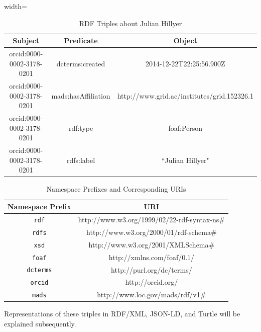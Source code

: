 \begin{table}
    \centering
    \begin{adjustbox}{width=\textwidth}
        \begin{tabular}{|c|c|c|}
            \hline
             \textbf{Subject} & \textbf{Predicate} & \textbf{Object} \\
            \hline
             orcid:0000-0002-3178-0201 & dcterms:created & 2014-12-22T22:25:56.900Z \\
             orcid:0000-0002-3178-0201 & mads:hasAffiliation & http://www.grid.ac/institutes/grid.152326.1 \\
             orcid:0000-0002-3178-0201 & rdf:type & foaf:Person \\
             orcid:0000-0002-3178-0201 & rdfs:label & ``Julian Hillyer" \\
            \hline
        \end{tabular}
    \end{adjustbox}
    \caption{RDF Triples about Julian Hillyer \citep{heardlibrary_serialization}}
    \label{tab:sample-rdf}
\end{table}

\begin{table}
    \centering
    \begin{tabular}{|c|c|}
        \hline
         \textbf{Namespace Prefix} & \textbf{URI} \\
        \hline
         \texttt{rdf} & http://www.w3.org/1999/02/22-rdf-syntax-ns\# \\
         \texttt{rdfs} & http://www.w3.org/2000/01/rdf-schema\# \\
         \texttt{xsd} & http://www.w3.org/2001/XMLSchema\# \\
         \texttt{foaf} & http://xmlns.com/foaf/0.1/ \\
         \texttt{dcterms} & http://purl.org/dc/terms/ \\
         \texttt{orcid} & http://orcid.org/ \\
         \texttt{mads} & http://www.loc.gov/mads/rdf/v1\# \\
        \hline
    \end{tabular}
    \caption{Namespace Prefixes and Corresponding URIs \citep{heardlibrary_serialization}}
    \label{tab:sample-rdf-qname}
\end{table}

Representations of these triples in RDF/XML, JSON-LD, and Turtle will be explained subsequently.

